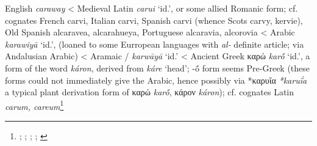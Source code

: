\begin{etymology}\label{ety:caraway}
English \textit{caraway}
< Medieval Latin \textit{carui} `id.', or some allied Romanic form; cf. cognates French carvi, Italian carvi, Spanish carvi (whence Scots carvy, kervie), Old Spanish alcaravea, alcarahueya, Portuguese alcaravia, alcorovia
< Arabic \textit{karawiyā} `id.', (loaned to some Eurropean languages with \textit{al-} definite article; via Andalusian Arabic)
< Aramaic {/} \textit{karwāyā} `id.'
< Ancient Greek {καρώ} \textit{karṓ} `id.', a form of the word \textit{káron}, derived from \textit{káre} `head'; -ṓ form seems Pre-Greek (these forms could not immediately give the Arabic, hence possibly via *καρυΐα \textit{*karuḯa} a typical plant derivation form of καρώ \textit{karṓ}, κάρον \textit{káron}); cf. cognates Latin \textit{carum, careum}\footnote{\textcite[s.v. caraway]{oed}; \textcite[s.v. caraway]{ahd}; \textcite[74]{corriente_dictionary_2008}; \textcites[207]{low_aramaeische_1881}[437-438]{low_flora_1924}; \textcites[653]{beekes_etymological_2010}[599]{sokoloff_dictionary_2002}}
\end{etymology}